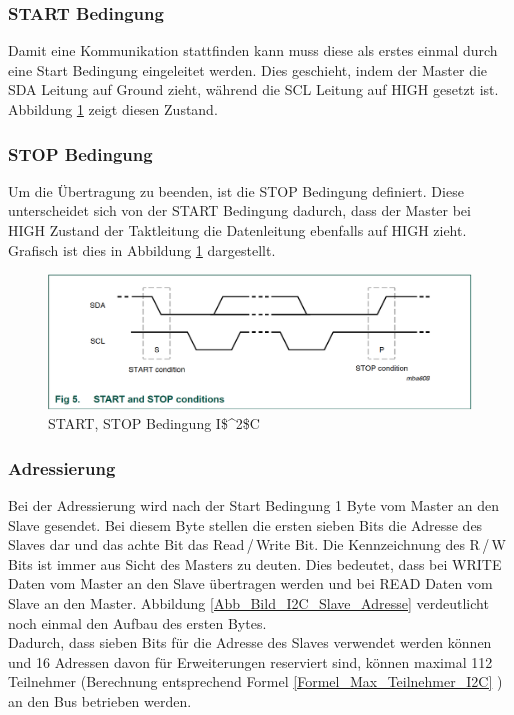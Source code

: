 \subsubsection*{START Bedingung}
\label{subsubsection_START_Bedingung}
Damit eine Kommunikation stattfinden kann muss diese als erstes einmal durch eine Start Bedingung eingeleitet werden. Dies geschieht, indem der Master die SDA Leitung auf Ground zieht, während die SCL Leitung auf HIGH gesetzt ist. Abbildung \ref{Abb_Bild_I2C_START_STOP} zeigt diesen Zustand.

\subsubsection*{STOP Bedingung}
\label{subsubsection_STOP_Bedingung}
Um die Übertragung zu beenden, ist die STOP Bedingung definiert. Diese unterscheidet sich von der START Bedingung dadurch, dass der Master bei HIGH Zustand der Taktleitung die Datenleitung ebenfalls auf HIGH zieht. Grafisch ist dies in Abbildung \ref{Abb_Bild_I2C_START_STOP} dargestellt.

\begin{figure}[!h] 
  \centering
     \includegraphics[scale=.65]{BilderAllgemein/I2C_START_STOP.png}
  \caption{START, STOP Bedingung \ac{I$^2$C}  \citep[S. 9]{I2C_Datenblatt}}
  \label{Abb_Bild_I2C_START_STOP}
\end{figure}

\subsubsection*{Adressierung}
\label{subsubsection_Adressierung}
Bei der Adressierung wird nach der Start Bedingung 1 Byte vom Master an den Slave gesendet. Bei diesem Byte stellen die ersten sieben Bits die Adresse des Slaves dar und das achte Bit das Read\,/\,Write Bit. Die Kennzeichnung des R\,/\,W Bits ist immer aus Sicht des Masters zu deuten. Dies bedeutet, dass bei WRITE Daten vom Master an den Slave übertragen werden und bei READ Daten vom Slave an den Master.
Abbildung \ref{Abb_Bild_I2C_Slave_Adresse} verdeutlicht noch einmal den Aufbau des ersten Bytes.\\ Dadurch, dass sieben Bits für die Adresse des Slaves verwendet werden können und 16 Adressen davon für Erweiterungen reserviert sind, können maximal 112 Teilnehmer (Berechnung entsprechend Formel \ref{Formel_Max_Teilnehmer_I2C} ) an den Bus betrieben werden.

